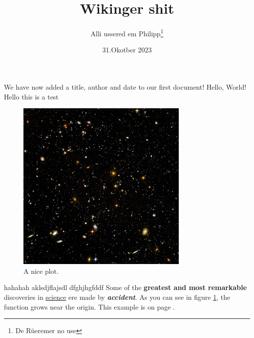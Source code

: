 \documentclass[12pt, letterpaper]{article}
\title{Wikinger shit}
\author{Alli ussered em Philipp\thanks{De Rüeremer no use}}
\date{31.Okotber 2023}
\begin{document}
\maketitle
We have now added a title, author and date to our first document!
Hello, World!
Hello this is a test
\begin{figure}
    \centering
    \includegraphics[width=0.75\textwidth]{delte_me_1}
    \caption{A nice plot.}
    \label{fig:delte_me_11}
\end{figure}
hahahah aklsdjflajsdl dfghjhgfddf
Some of the \textbf{greatest and most remarkable}
discoveries in \underline{science} ere made by \textbf{\textit{accident}}.
As you can see in figure \ref{fig:delte_me_11}, the function grows near the origin. This example is on page \pageref{fig:delte_me_11}.
\end{document}
